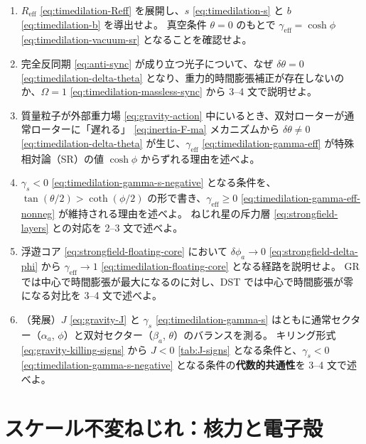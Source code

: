 \documentclass[dvipdfmx,a4paper,oneside]{jsbook}
\numberwithin{equation}{chapter}
\begin{document}
\begin{enumerate}[leftmargin=2em]
  \item \(R_{\mathrm{eff}}\) \eqref{eq:timedilation-Reff} を展開し、\(s\) \eqref{eq:timedilation-s} と \(b\) \eqref{eq:timedilation-b} を導出せよ。
  真空条件 \(\theta = 0\) のもとで \(\gamma_{\mathrm{eff}} = \cosh\phi\) \eqref{eq:timedilation-vacuum-sr} となることを確認せよ。

  \item 完全反同期 \eqref{eq:anti-sync} が成り立つ光子について、なぜ \(\delta\theta = 0\) \eqref{eq:timedilation-delta-theta} となり、重力的時間膨張補正が存在しないのか、\(\Omega = 1\) \eqref{eq:timedilation-massless-sync} から 3--4 文で説明せよ。

  \item 質量粒子が外部重力場 \eqref{eq:gravity-action} 中にいるとき、双対ローターが通常ローターに「遅れる」 \eqref{eq:inertia-F-ma} メカニズムから \(\delta\theta \neq 0\) \eqref{eq:timedilation-delta-theta} が生じ、\(\gamma_{\mathrm{eff}}\) \eqref{eq:timedilation-gamma-eff} が特殊相対論（SR）の値 \(\cosh\phi\) からずれる理由を述べよ。

  \item \(\gamma_s < 0\) \eqref{eq:timedilation-gamma-s-negative} となる条件を、\(\tan(\theta/2) > \coth(\phi/2)\) の形で書き、\(\gamma_{\mathrm{eff}} \geq 0\) \eqref{eq:timedilation-gamma-eff-nonneg} が維持される理由を述べよ。
  ねじれ星の斥力層 \eqref{eq:strongfield-layers} との対応を 2--3 文で述べよ。

  \item 浮遊コア \eqref{eq:strongfield-floating-core} において \(\delta\phi_a \to 0\) \eqref{eq:strongfield-delta-phi} から \(\gamma_{\mathrm{eff}} \to 1\) \eqref{eq:timedilation-floating-core} となる経路を説明せよ。
  GR では中心で時間膨張が最大になるのに対し、DST では中心で時間膨張が零になる対比を 3--4 文で述べよ。

  \item （発展）\(J\) \eqref{eq:gravity-J} と \(\gamma_s\) \eqref{eq:timedilation-gamma-s} はともに通常セクター（\(\alpha_a\), \(\phi\)）と双対セクター（\(\beta_a\), \(\theta\)）のバランスを測る。
  キリング形式 \eqref{eq:gravity-killing-signs} から \(J < 0\) \eqref{tab:J-signs} となる条件と、\(\gamma_s < 0\) \eqref{eq:timedilation-gamma-s-negative} となる条件の\textbf{代数的共通性}を 3--4 文で述べよ。
\end{enumerate}

\chapter{スケール不変ねじれ：核力と電子殻}
\end{document}
